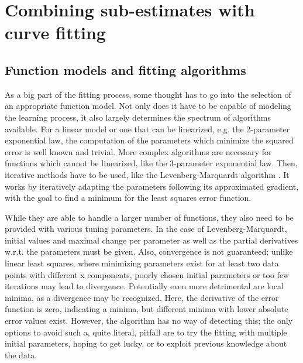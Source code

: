 \section{Combining sub-estimates with curve fitting}

\subsection{Function models and fitting algorithms}
As a big part of the fitting process, some thought has to go into the selection of an appropriate function model. Not only does it have to be capable of modeling the learning process, it also largely determines the spectrum of algorithms available. For a linear model or one that can be linearized, e.g. the 2-parameter exponential law, the computation of the parameters which minimize the squared error is well known and trivial. More complex algorithms are necessary for functions which cannot be linearized, like the 3-parameter exponential law. Then, iterative methods have to be used, like the Levenberg-Marquardt algorithm \cite{Levenberg1944}. It works by iteratively adapting the parameters following its approximated gradient, with the goal to find a minimum for the least squares error function.

While they are able to handle a larger number of functions, they also need to be provided with various tuning parameters. In the case of Levenberg-Marquardt, initial values and maximal change per parameter as well as the partial derivatives w.r.t. the parameters must be given. Also, convergence is not guaranteed; unlike linear least squares, where minimizing parameters exist for at least two data points with different x components, poorly chosen initial parameters or too few iterations may lead to divergence. Potentially even more detrimental are local minima, as a divergence may be recognized. Here, the derivative of the error function is zero, indicating a minima, but different minima with lower absolute error values exist. However, the algorithm has no way of detecting this; the only options to avoid such a, quite literal, pitfall are to try the fitting with multiple initial parameters, hoping to get lucky, or to exploit previous knowledge about the data.

